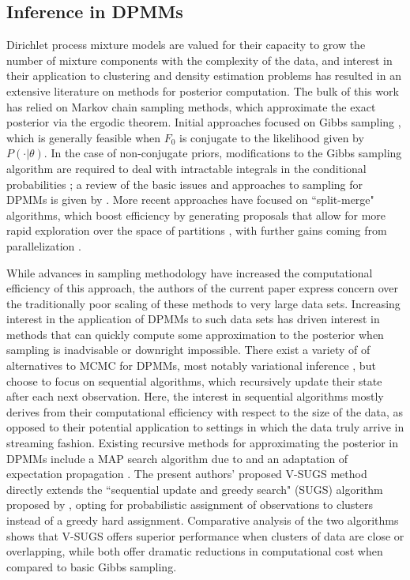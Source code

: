 \documentclass{uwstat572}
\begin{document}
\subsection{Inference in DPMMs}

Dirichlet process mixture models are valued for their capacity to grow the number of mixture components with the complexity of the data, and interest in their application to clustering and density estimation problems has resulted in an extensive literature on methods for posterior computation. The bulk of this work has relied on Markov chain sampling methods, which approximate the exact posterior via the ergodic theorem. Initial approaches focused on Gibbs sampling \citep{bush,west}, which is generally feasible when $F_0$ is conjugate to the likelihood given by $P(\cdot | \theta)$. In the case of non-conjugate priors, modifications to the Gibbs sampling algorithm are required to deal with intractable integrals in the conditional probabilities \citep{maceachern}; a review of the basic issues and approaches to sampling for DPMMs is given by \citet{neal}. More recent approaches have focused on ``split-merge" algorithms, which boost efficiency by generating proposals that allow for more rapid exploration over the space of partitions \citep{jain}, with further gains coming from parallelization \citep{bouchard,chang}.

While advances in sampling methodology have increased the computational efficiency of this approach, the authors of the current paper express concern over the traditionally poor scaling of these methods to very large data sets. Increasing interest in the application of DPMMs to such data sets has driven interest in methods that can quickly compute some approximation to the posterior when sampling is inadvisable or downright impossible. There exist a variety of of alternatives to MCMC for DPMMs, most notably variational inference \citep{blei}, but \cite{zhang} choose to focus on sequential algorithms, which recursively update their state after each next observation. Here, the interest in sequential algorithms mostly derives from their computational efficiency with respect to the size of the data, as opposed to their potential application to settings in which the data truly arrive in streaming fashion. Existing recursive methods for approximating the posterior in DPMMs include a MAP search algorithm due to \citet{daume} and an adaptation of expectation propagation \citep{minka}. The present authors' proposed V-SUGS method directly extends the ``sequential update and greedy search" (SUGS) algorithm proposed by \cite{wang}, opting for probabilistic assignment of observations to clusters instead of a greedy hard assignment. Comparative analysis of the two algorithms shows that V-SUGS offers superior performance when clusters of data are close or overlapping, while both offer dramatic reductions in computational cost when compared to basic Gibbs sampling.
\end{document}
